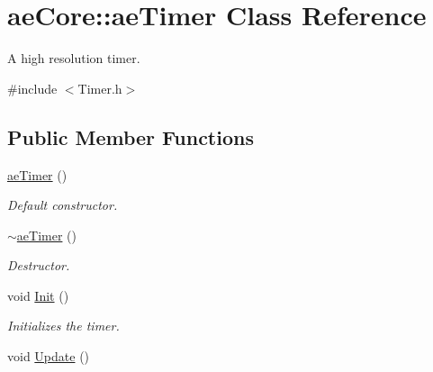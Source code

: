 \hypertarget{classae_core_1_1ae_timer}{}\section{ae\+Core\+:\+:ae\+Timer Class Reference}
\label{classae_core_1_1ae_timer}


A high resolution timer.  




{\ttfamily \#include $<$Timer.\+h$>$}

\subsection*{Public Member Functions}
\begin{DoxyCompactItemize}
\item 
\hyperlink{classae_core_1_1ae_timer_af5b631c937f1b71ca2ead2ebc6dd0f62}{ae\+Timer} ()\hypertarget{classae_core_1_1ae_timer_af5b631c937f1b71ca2ead2ebc6dd0f62}{}\label{classae_core_1_1ae_timer_af5b631c937f1b71ca2ead2ebc6dd0f62}

\begin{DoxyCompactList}\small\item\em Default constructor. \end{DoxyCompactList}\item 
\hyperlink{classae_core_1_1ae_timer_a6b6d3c48c0b1163b7fda736fbc79963c}{$\sim$ae\+Timer} ()\hypertarget{classae_core_1_1ae_timer_a6b6d3c48c0b1163b7fda736fbc79963c}{}\label{classae_core_1_1ae_timer_a6b6d3c48c0b1163b7fda736fbc79963c}

\begin{DoxyCompactList}\small\item\em Destructor. \end{DoxyCompactList}\item 
void \hyperlink{classae_core_1_1ae_timer_a6a2353d54db148d81681e5dc2fdd73f9}{Init} ()\hypertarget{classae_core_1_1ae_timer_a6a2353d54db148d81681e5dc2fdd73f9}{}\label{classae_core_1_1ae_timer_a6a2353d54db148d81681e5dc2fdd73f9}

\begin{DoxyCompactList}\small\item\em Initializes the timer. \end{DoxyCompactList}\item 
void \hyperlink{classae_core_1_1ae_timer_a5b5ca15b825508452ea829047a89c498}{Update} ()\hypertarget{classae_core_1_1ae_timer_a5b5ca15b825508452ea829047a89c498}{}\label{classae_core_1_1ae_timer_a5b5ca15b825508452ea829047a89c498}


\end{DoxyCompactItemize}
